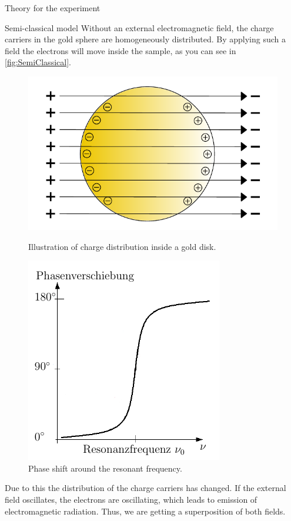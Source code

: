 \documentclass[pdftex, a4paper,11pt, twoside, UKenglish]{report}
\begin{document}
\begin{chapter}{Theory for the experiment}
    
    
    \begin{section}{Semi-classical model}
        Without an external electromagnetic field, the charge carriers in the
        gold sphere are homogeneously distributed.
        By applying such a field the electrons will move inside the sample, as
        you can see in \cref{fig:SemiClassical}. 
        \begin{figure}[htbp]
          \centering
          \begin{minipage}{.48\textwidth}
            \centering
            \includegraphics[width=\textwidth]{Figures/SemiClassical.png}
            \caption{Illustration of charge distribution inside a gold disk.
            \cite{bib:Theorieteil}}
            \label{fig:SemiClassical}
          \end{minipage}\quad
          \begin{minipage}{.48\textwidth}
            \centering
            \includegraphics[width=.6\textwidth]{Figures/Phaseshift.png}
            \caption{Phase shift around the resonant frequency.
            \cite{bib:Theorieteil}}
            \label{fig:Phaseshift}
          \end{minipage}
        \end{figure}
        Due to this the distribution of the charge carriers has changed.
        If the external field oscillates, the electrons are oscillating, which
        leads to emission of electromagnetic radiation.
        Thus, we are getting a superposition of both fields.


\end{section}
\end{chapter}
\end{document}
